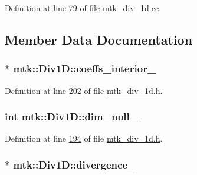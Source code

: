 Definition at line \hyperlink{mtk__div__1d_8cc_source_l00079}{79} of file \hyperlink{mtk__div__1d_8cc_source}{mtk\+\_\+div\+\_\+1d.\+cc}.



\subsection{Member Data Documentation}
\hypertarget{classmtk_1_1Div1D_a7c7688d8ac25120587353ece4e93a13a}{
\subsubsection[{coeffs\+\_\+interior\+\_\+}]{$\ast$ mtk\+::\+Div1\+D\+::coeffs\+\_\+interior\+\_\+\hspace{0.3cm}{\ttfamily [private]}}}\label{classmtk_1_1Div1D_a7c7688d8ac25120587353ece4e93a13a}


Definition at line \hyperlink{mtk__div__1d_8h_source_l00202}{202} of file \hyperlink{mtk__div__1d_8h_source}{mtk\+\_\+div\+\_\+1d.\+h}.

\hypertarget{classmtk_1_1Div1D_a264027144def76d802778391f55381a0}{
\subsubsection[{dim\+\_\+null\+\_\+}]{\setlength{\rightskip}{0pt plus 5cm}int mtk\+::\+Div1\+D\+::dim\+\_\+null\+\_\+\hspace{0.3cm}{\ttfamily [private]}}}\label{classmtk_1_1Div1D_a264027144def76d802778391f55381a0}


Definition at line \hyperlink{mtk__div__1d_8h_source_l00194}{194} of file \hyperlink{mtk__div__1d_8h_source}{mtk\+\_\+div\+\_\+1d.\+h}.

\hypertarget{classmtk_1_1Div1D_a0f96410051ba1fa6d91dfa7b7eacead9}{
\subsubsection[{divergence\+\_\+}]{$\ast$ mtk\+::\+Div1\+D\+::divergence\+\_\+\hspace{0.3cm}{\ttfamily [private]}}}\label{classmtk_1_1Div1D_a0f96410051ba1fa6d91dfa7b7eacead9}


